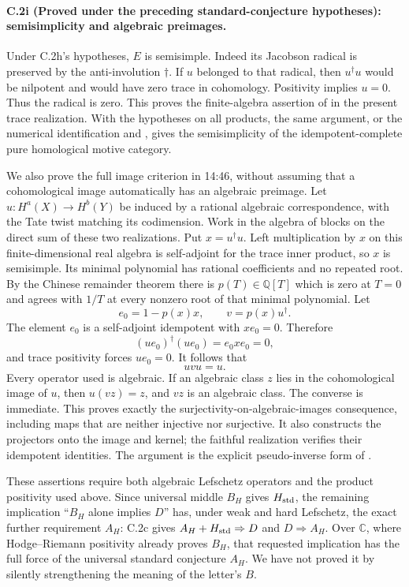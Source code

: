 \paragraph{C.2i (Proved under the preceding standard-conjecture hypotheses): semisimplicity and algebraic preimages.}
Under C.2h's hypotheses, $E$ is semisimple. Indeed its Jacobson radical
is preserved by the anti-involution $\dagger$. If $u$ belonged to that
radical, then $u^\dagger u$ would be nilpotent and would have zero trace
in cohomology. Positivity implies $u=0$. Thus the radical is zero.
This proves the finite-algebra assertion of
\citet[Corollary 3.12 and Lemma 3.13]{cyKleiman1968} in the present
trace realization. With the hypotheses on all products, the same
argument, or the numerical identification and
\citet[Theorem 1]{Jannsen1992}, gives the semisimplicity of the
idempotent-complete pure homological motive category.

We also prove the full image criterion in 14:46, without assuming
that a cohomological image automatically has an algebraic preimage.
Let $u:H^a(X)\to H^b(Y)$ be induced by a rational algebraic
correspondence, with the Tate twist matching its codimension.
Work in the algebra of blocks on the direct sum of these two
realizations. Put $x=u^\dagger u$. Left multiplication by $x$ on
this finite-dimensional real algebra is self-adjoint for the trace
inner product, so $x$ is semisimple. Its minimal polynomial has
rational coefficients and no repeated root. By the Chinese remainder
theorem there is $p(T)\in\mathbb Q[T]$ which is zero at $T=0$ and
agrees with $1/T$ at every nonzero root of that minimal polynomial.
Let
\[
                    e_0=1-p(x)x,\qquad v=p(x)u^\dagger.
\]
The element $e_0$ is a self-adjoint idempotent with $xe_0=0$.
Therefore
\[
 (ue_0)^\dagger(ue_0)=e_0xe_0=0,
\]
and trace positivity forces $ue_0=0$. It follows that
\[
                         uvu=u.
\]
Every operator used is algebraic. If an algebraic class $z$ lies
in the cohomological image of $u$, then $u(vz)=z$, and $vz$ is an
algebraic class. The converse is immediate. This proves exactly the
surjectivity-on-algebraic-images consequence, including maps that are
neither injective nor surjective. It also constructs the projectors
onto the image and kernel; the faithful realization verifies their
idempotent identities. The argument is the explicit pseudo-inverse
form of \citet[Corollary 3.14]{cyKleiman1968}.

These assertions require both algebraic Lefschetz operators and the
product positivity used above. Since universal middle $B_H$ gives
$H_{\rm std}$, the remaining implication ``$B_H$ alone implies $D$''
has, under weak and hard Lefschetz, the exact further requirement
$A_H$: C.2c gives $A_H+H_{\rm std}\Rightarrow D$ and
$D\Rightarrow A_H$. Over $\mathbb C$, where Hodge--Riemann positivity
already proves $B_H$, that requested implication has the full force
of the universal standard conjecture $A_H$. We have not proved it by
silently strengthening the meaning of the letter's $B$.


